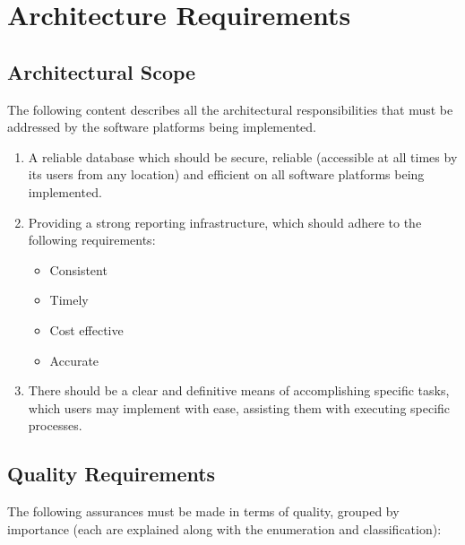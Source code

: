 \documentclass[hidelinks,a4paper,12pt]{article}
\begin{document}
		\footnotesize
		\normalsize
		
		\newpage
		
		\newpage
		\section{Architecture Requirements}  
			\subsection{Architectural Scope}
				The following content describes all the architectural responsibilities that must be addressed by the software platforms being implemented.
				\begin{enumerate}
					\item A reliable database which should be secure, reliable (accessible at all times by its users from any location) and efficient on all software platforms being implemented.
					\item Providing a strong reporting infrastructure, which should adhere to the following requirements:
					\begin{itemize}
						\item Consistent
						\item Timely
						\item Cost effective
						\item Accurate
					\end{itemize}
					\item There should be a clear and definitive means of accomplishing specific tasks, which users may implement with ease, assisting them with executing specific processes.
				\end{enumerate}
			\subsection{Quality Requirements}
			The following assurances must be made in terms of quality, grouped by importance (each are explained along with the enumeration and classification):
			
\end{document}

